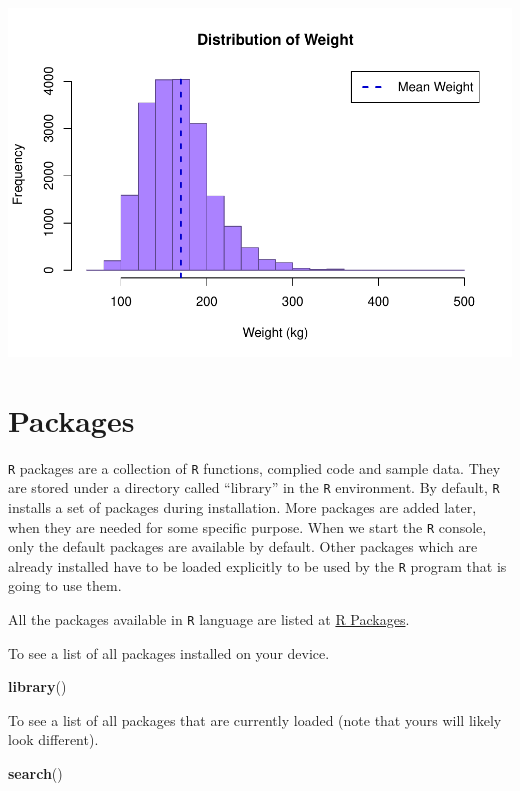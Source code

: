 \documentclass[
]{book}
\newenvironment{Shaded}{\begin{snugshade}}{\end{snugshade}}
\newcommand{\KeywordTok}[1]{\textcolor[rgb]{0.13,0.29,0.53}{\textbf{#1}}}
\newcommand{\NormalTok}[1]{#1}
\begin{document}
\includegraphics{_main_files/figure-latex/unnamed-chunk-148-1.pdf}

\hypertarget{packages}{%
\chapter{Packages}\label{packages}}

\texttt{R} packages are a collection of \texttt{R} functions, complied code and sample data. They are stored under a directory called ``library'' in the \texttt{R} environment. By default, \texttt{R} installs a set of packages during installation. More packages are added later, when they are needed for some specific purpose. When we start the \texttt{R} console, only the default packages are available by default. Other packages which are already installed have to be loaded explicitly to be used by the \texttt{R} program that is going to use them.

All the packages available in \texttt{R} language are listed at \href{https://cran.r-project.org/web/packages/available_packages_by_name.html}{R Packages}.

To see a list of all packages installed on your device.

\begin{Shaded}
\begin{Highlighting}[]
\KeywordTok{library}\NormalTok{()}
\end{Highlighting}
\end{Shaded}

To see a list of all packages that are currently loaded (note that yours will likely look different).

\begin{Shaded}
\begin{Highlighting}[]
\KeywordTok{search}\NormalTok{()}
\end{Highlighting}
\end{Shaded}
\end{document}
